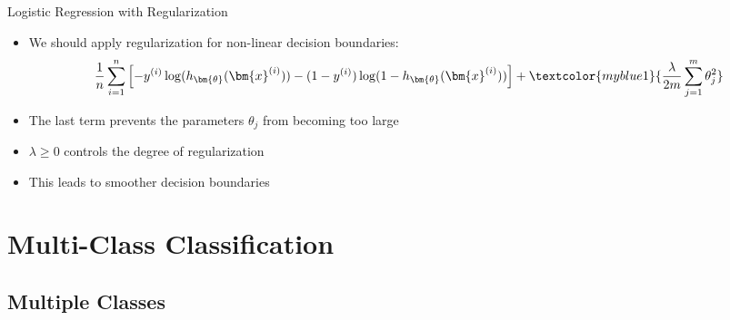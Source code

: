 \begin{frame}{Logistic Regression with Regularization}{}
	\begin{itemize}
		\item We should apply regularization for non-linear decision boundaries:
		\footnotesize
		\begin{equation}
			\frac{1}{n} \sum_{i=1}^n \left[
				-y^{(i)} \log(h_{\bm{\theta}}(\bm{x}^{(i)})) - (1 - y^{(i)}) \log(1 - h_{\bm{\theta}}(\bm{x}^{(i)}))
			\right] + \textcolor{myblue1}{\frac{\lambda}{2m} \sum_{j=1}^m \theta_j^2}
		\end{equation}
		\normalsize
		\item The last term prevents the parameters $\theta_j$ from becoming too large
		\item $\lambda \ge 0$ controls the degree of regularization
		\item This leads to smoother decision boundaries
	\end{itemize}
\end{frame}


\section{Multi-Class Classification}

\subsection{Multiple Classes}

